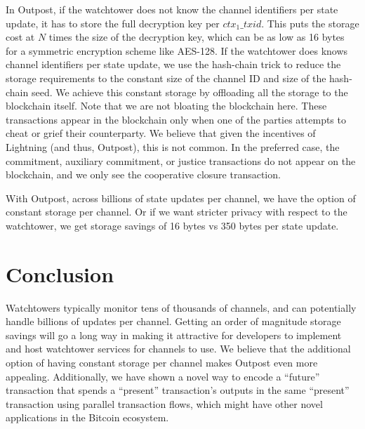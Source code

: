 In Outpost, if the watchtower does not know the channel identifiers per state update, it has to store the full decryption key per $\mathit{ctx_1\_txid}$. This puts the storage cost at $N$ times the size of the decryption key, which can be as low as 16 bytes for a symmetric encryption scheme like AES-128. If the watchtower does knows channel identifiers per state update, we use the hash-chain trick to reduce the storage requirements to the constant size of the channel ID and size of the hash-chain seed. We achieve this constant storage by offloading all the storage to the blockchain itself. Note that we are not bloating the blockchain here. These transactions appear in the blockchain only when one of the parties attempts to cheat or grief their counterparty. We believe that given the incentives of Lightning (and thus, Outpost), this is not common. In the preferred case, the commitment, auxiliary commitment, or justice transactions do not appear on the blockchain, and we only see the cooperative closure transaction.

With Outpost, across billions of state updates per channel, we have the option of constant storage per channel. Or if we want stricter privacy with respect to the watchtower, we get storage savings of 16 bytes vs 350 bytes per state update.

\section{Conclusion}
Watchtowers typically monitor tens of thousands of channels, and can potentially handle billions of updates per channel. Getting an order of magnitude storage savings will go a long way in making it attractive for developers to implement and host watchtower services for channels to use. We believe that the additional option of having constant storage per channel makes Outpost even more appealing. Additionally, we have shown a novel way to encode a ``future'' transaction that spends a ``present'' transaction's outputs in the same ``present'' transaction using parallel transaction flows, which might have other novel applications in the Bitcoin ecosystem. 